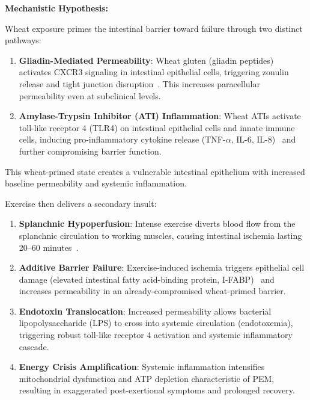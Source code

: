 \begin{speculation}
\label{spec:wheat-primed-exercise}

\textbf{Mechanistic Hypothesis:}

Wheat exposure primes the intestinal barrier toward failure through two distinct pathways:

\begin{enumerate}
    \item \textbf{Gliadin-Mediated Permeability}: Wheat gluten (gliadin peptides) activates CXCR3 signaling in intestinal epithelial cells, triggering zonulin release and tight junction disruption~\cite{Drago2006}. This increases paracellular permeability even at subclinical levels.

    \item \textbf{Amylase-Trypsin Inhibitor (ATI) Inflammation}: Wheat ATIs activate toll-like receptor 4 (TLR4) on intestinal epithelial cells and innate immune cells, inducing pro-inflammatory cytokine release (TNF-$\alpha$, IL-6, IL-8)~\cite{Junker2012} and further compromising barrier function.
\end{enumerate}

This wheat-primed state creates a vulnerable intestinal epithelium with increased baseline permeability and systemic inflammation.

Exercise then delivers a secondary insult:

\begin{enumerate}
    \item \textbf{Splanchnic Hypoperfusion}: Intense exercise diverts blood flow from the splanchnic circulation to working muscles, causing intestinal ischemia lasting 20--60 minutes~\cite{vanWijck2011}.

    \item \textbf{Additive Barrier Failure}: Exercise-induced ischemia triggers epithelial cell damage (elevated intestinal fatty acid-binding protein, I-FABP)~\cite{March2017} and increases permeability in an already-compromised wheat-primed barrier.

    \item \textbf{Endotoxin Translocation}: Increased permeability allows bacterial lipopolysaccharide (LPS) to cross into systemic circulation (endotoxemia), triggering robust toll-like receptor 4 activation and systemic inflammatory cascade.

    \item \textbf{Energy Crisis Amplification}: Systemic inflammation intensifies mitochondrial dysfunction and ATP depletion characteristic of PEM, resulting in exaggerated post-exertional symptoms and prolonged recovery.
\end{enumerate}


\end{speculation}
